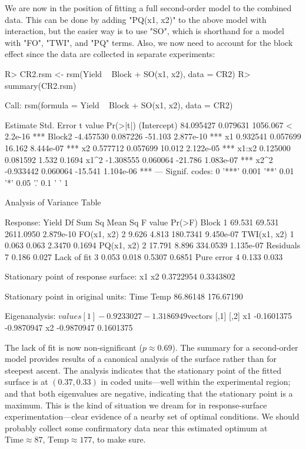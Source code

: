 \documentclass[article,nojss]{jss}
\begin{document}
We are now in the position of fitting a full second-order model to the combined data.  This can be done by adding "PQ(x1, x2)" to the above model with interaction, but the easier way is to use "SO", which is shorthand for a model with "FO", "TWI", and "PQ" terms.  Also, we now need to account for the block effect since the data are collected in separate experiments:
\begin{Schunk}
\begin{Sinput}
R> CR2.rsm <- rsm(Yield ~ Block + SO(x1, x2), data = CR2)
R> summary(CR2.rsm)
\end{Sinput}
\begin{Soutput}
Call:
rsm(formula = Yield ~ Block + SO(x1, x2), data = CR2)

             Estimate Std. Error  t value  Pr(>|t|)    
(Intercept) 84.095427   0.079631 1056.067 < 2.2e-16 ***
Block2      -4.457530   0.087226  -51.103 2.877e-10 ***
x1           0.932541   0.057699   16.162 8.444e-07 ***
x2           0.577712   0.057699   10.012 2.122e-05 ***
x1:x2        0.125000   0.081592    1.532    0.1694    
x1^2        -1.308555   0.060064  -21.786 1.083e-07 ***
x2^2        -0.933442   0.060064  -15.541 1.104e-06 ***
---
Signif. codes:  0 '***' 0.001 '**' 0.01 '*' 0.05 '.' 0.1 ' ' 1 

Analysis of Variance Table

Response: Yield
            Df Sum Sq Mean Sq   F value    Pr(>F)
Block        1 69.531  69.531 2611.0950 2.879e-10
FO(x1, x2)   2  9.626   4.813  180.7341 9.450e-07
TWI(x1, x2)  1  0.063   0.063    2.3470    0.1694
PQ(x1, x2)   2 17.791   8.896  334.0539 1.135e-07
Residuals    7  0.186   0.027                    
Lack of fit  3  0.053   0.018    0.5307    0.6851
Pure error   4  0.133   0.033                    

Stationary point of response surface:
       x1        x2 
0.3722954 0.3343802 

Stationary point in original units:
     Time      Temp 
 86.86148 176.67190 

Eigenanalysis:
$values
[1] -0.9233027 -1.3186949

$vectors
         [,1]       [,2]
x1 -0.1601375 -0.9870947
x2 -0.9870947  0.1601375
\end{Soutput}
\end{Schunk}
The lack of fit is now non-significant ($p \approx 0.69$).   The summary for a second-order model provides
results of a canonical analysis of the surface rather than for steepest ascent.  The analysis indicates that
the stationary point of the fitted surface is at $(0.37, 0.33)$ in coded units---well within the experimental region; and that both eigenvalues are negative, indicating that the stationary point is a maximum.  This is the kind of situation we dream for in response-surface experimentation---clear evidence of a nearby set of optimal conditions.  We should probably collect some confirmatory data near this estimated optimum at $\text{Time}\approx87$, $\text{Temp}\approx 177$, to make sure.
\end{document}
